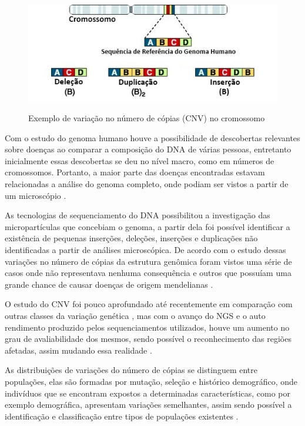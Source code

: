 \begin{figure}[!htb]
    \centering
    \caption{Exemplo de variação no número de cópias (CNV) no cromossomo}
    \includegraphics[width=1\textwidth]{./dados/figuras/copy-number-variation}
    \label{fig:figura-copy-number-variation}
\end{figure}

Com o estudo do genoma humano \cite{Lander2001} houve a possibilidade de descobertas relevantes sobre doenças ao comparar a composição do DNA de várias pessoas, entretanto inicialmente essas descobertas se deu no nível macro, como em números de cromossomos. Portanto, a maior parte das doenças encontradas estavam relacionadas a análise do genoma completo, onde podiam ser vistos a partir de um microscópio \cite{Feuk2006}. 

As tecnologias de sequenciamento do DNA possibilitou a investigação das micropartículas que concebiam o genoma, a partir dela foi possível identificar a existência de pequenas inserções, deleções, inserções e duplicações não identificadas a partir de análises microscópica. De acordo com o estudo dessas variações no número de cópias da estrutura genômica foram vistos uma série de casos onde não representava nenhuma consequência e outros que possuíam uma grande chance de causar doenças de origem mendelianas \cite{Feuk2006,Xi2011}. 

O estudo do CNV foi pouco aprofundado até recentemente em comparação com outras classes da variação genética \cite{Redon2006}, mas com o avanço do NGS e o auto rendimento produzido pelos sequenciamentos utilizados, houve um aumento no grau de avaliabilidade dos mesmos, sendo possível o reconhecimento das regiões afetadas, assim mudando essa realidade \cite{Mills2011,Feuk2006}.

As distribuições de variações do número de cópias se distinguem entre populações, elas são formadas por mutação, seleção e histórico demográfico, onde indivíduos que se encontram expostos a determinadas características, como por exemplo demográfica, apresentam variações semelhantes, assim sendo possível a identificação e classificação entre tipos de populações existentes \cite{Redon2006}. 

